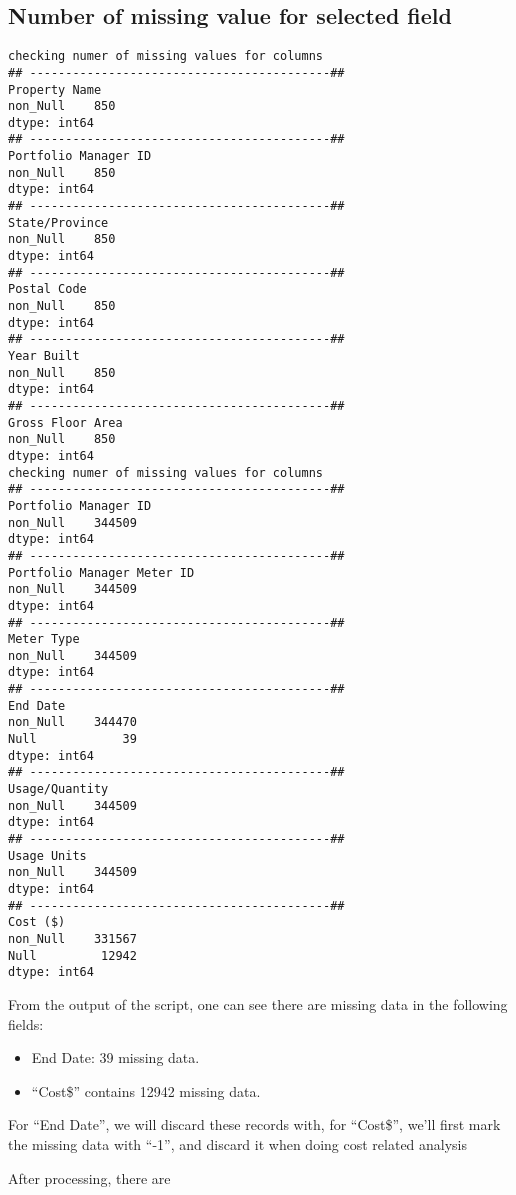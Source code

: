 \documentclass[12pt]{article}
\begin{document}
\subsection{Number of missing value for selected field}
\makeatletter
\def\verbatim@font{\linespread{1}\small\ttfamily}
\begin{verbatim}
checking numer of missing values for columns
## ------------------------------------------##
Property Name
non_Null    850
dtype: int64
## ------------------------------------------##
Portfolio Manager ID
non_Null    850
dtype: int64
## ------------------------------------------##
State/Province
non_Null    850
dtype: int64
## ------------------------------------------##
Postal Code
non_Null    850
dtype: int64
## ------------------------------------------##
Year Built
non_Null    850
dtype: int64
## ------------------------------------------##
Gross Floor Area
non_Null    850
dtype: int64
checking numer of missing values for columns
## ------------------------------------------##
Portfolio Manager ID
non_Null    344509
dtype: int64
## ------------------------------------------##
Portfolio Manager Meter ID
non_Null    344509
dtype: int64
## ------------------------------------------##
Meter Type
non_Null    344509
dtype: int64
## ------------------------------------------##
End Date
non_Null    344470
Null            39
dtype: int64
## ------------------------------------------##
Usage/Quantity
non_Null    344509
dtype: int64
## ------------------------------------------##
Usage Units
non_Null    344509
dtype: int64
## ------------------------------------------##
Cost ($)
non_Null    331567
Null         12942
dtype: int64
\end{verbatim}
From the output of the script, one can see there are missing data in
the following fields:
\begin{itemize}
\item End Date: 39 missing data.
\item ``Cost\$'' contains 12942 missing data.
\end{itemize}

For ``End Date'', we will discard these records with, for ``Cost\$'',
we'll first mark the missing data with ``-1'', and discard it when
doing cost related analysis

After processing, there are 
\end{document}
